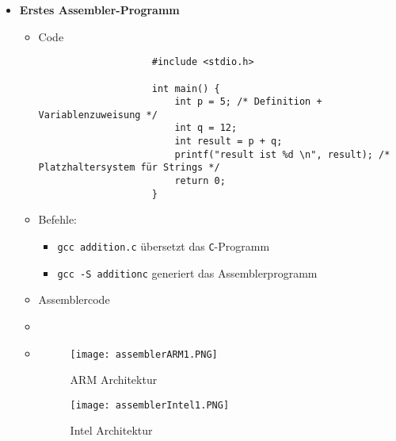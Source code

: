 \begin{itemize}
        \item \textbf{Erstes Assembler-Programm}
            \begin{itemize}
                \item Code
                    \begin{verbatim}
                    #include <stdio.h>

                    int main() {
                        int p = 5; /* Definition + Variablenzuweisung */
                        int q = 12;
                        int result = p + q;
                        printf("result ist %d \n", result); /* Platzhaltersystem für Strings */
                        return 0;
                    }
                    \end{verbatim}
                \item Befehle:
                    \begin{itemize}
                        \item \texttt{gcc addition.c} übersetzt das \texttt{C}-Programm 
                        \item \texttt{gcc -S additionc} generiert das Assemblerprogramm 
                    \end{itemize}
                
                \item Assemblercode
                \item[]
                \item[]
                    \begin{minipage}{0.45\textwidth}
                    \begin{figure}[H]
                        \centering
                        \texttt{[image: assemblerARM1.PNG]}
                        \caption{ARM Architektur}
                    \end{figure}
                    \end{minipage}
                    \begin{minipage}[t]{0.45\textwidth}
                    \vspace{-5cm}
                    \begin{figure}[H]
                        \centering
                        \texttt{[image: assemblerIntel1.PNG]}
                        \caption{Intel Architektur}
                    \end{figure}
                    \end{minipage}


\end{itemize}
\end{itemize}
